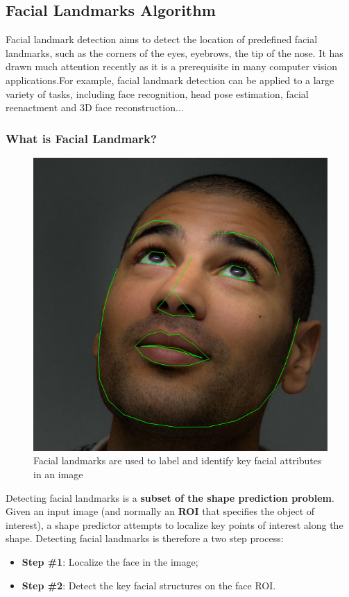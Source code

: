     \subsection{Facial Landmarks Algorithm}
        Facial landmark detection aims to detect the location of predefined facial landmarks, such as the corners of the eyes, eyebrows, the tip of the nose. It has drawn much attention 
        recently as it is a prerequisite in many computer vision applications.For example, facial landmark detection can be applied to a large variety of tasks, including face recognition, 
        head pose estimation, facial reenactment and 3D face reconstruction...
        \subsubsection{What is Facial Landmark?}
            \begin{figure}[H]
                \centering
                \includegraphics[width=0.6\linewidth]{img/facial.png}
                \caption{Facial landmarks are used to label and identify key facial attributes in an image}
            \end{figure}
            Detecting facial landmarks is a \textbf{subset of the shape prediction problem}. Given an input image (and normally an \textbf{ROI} that specifies the object of interest), 
            a shape predictor attempts to localize key points of interest along the shape. Detecting facial landmarks is therefore a two step process: 
            \begin{itemize}
                \item \textbf{Step \#1}: Localize the face in the image;
                \item \textbf{Step \#2}: Detect the key facial structures on the face ROI.
            \end{itemize}
